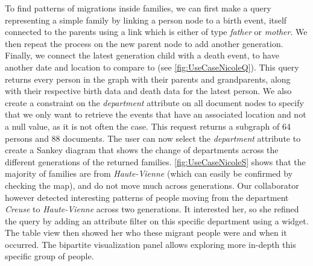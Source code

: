 To find patterns of migrations inside families, we can first make a query representing a simple family by linking a person node to a birth event, itself connected to the parents using a link which is either of type \textit{father} or \textit{mother}. We then repeat the process on the new parent node to add another generation. Finally, we connect the latest generation child with a death event, to have another date and location to compare to (see \autoref{fig:UseCaseNicoleQ}). This query returns every person in the graph with their parents and grandparents, along with their respective birth data and death data for the latest person. We also create a constraint on the \textit{department} attribute on all document nodes to specify that we only want to retrieve the events that have an associated location and not a null value, as it is not often the case. This request returns a subgraph of 64 persons and 88 documents. The user can now select the \textit{department} attribute to create a Sankey diagram that shows the change of departments across the different generations of the returned families. \autoref{fig:UseCaseNicoleS} shows that the majority of families are from \textit{Haute-Vienne} (which can easily be confirmed by checking the map), and do not move much across generations. Our collaborator however detected interesting patterns of people moving from the department \textit{Creuse} to \textit{Haute-Vienne} across two generations. It interested her, so she refined the query by adding an attribute filter on this specific department using a widget. The table view then showed her who these migrant people were and when it occurred. The bipartite visualization panel allows exploring more in-depth this specific group of people. %


